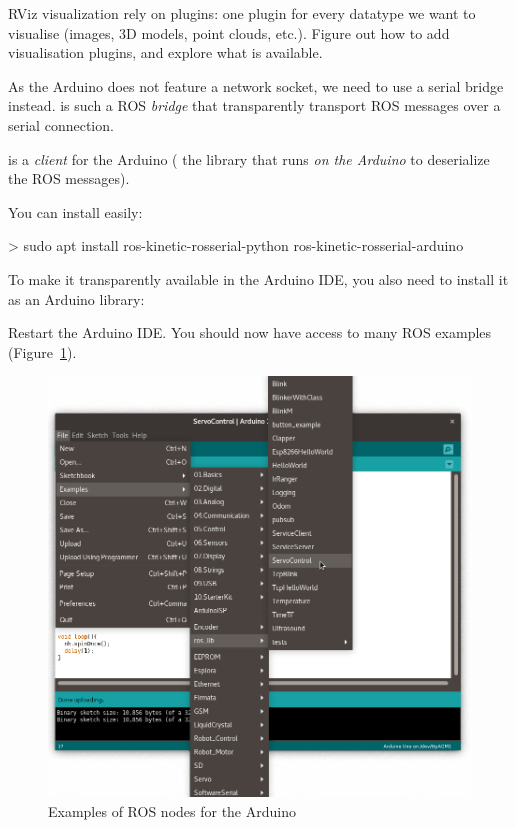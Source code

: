\documentclass{instructions}
\begin{document}
RViz visualization rely on plugins: one plugin for every datatype we want to
visualise (images, 3D models, point clouds, etc.). Figure out how to add
visualisation plugins, and explore what is available.


As the Arduino does not feature a network socket, we need to use a serial bridge
instead.   is such a ROS \emph{bridge} that transparently
transport ROS messages over a serial connection.

 is a  \emph{client} for the Arduino (\ie
the library that runs \emph{on the Arduino} to deserialize the ROS messages).

You can install  easily:

\begin{shcode}
> sudo apt install ros-kinetic-rosserial-python ros-kinetic-rosserial-arduino
\end{shcode}

To make it transparently available in the Arduino IDE, you also need to install
it as an Arduino library:


Restart the Arduino IDE. You should now have access to many ROS examples
(Figure~\ref{ros-arduino-examples}).

\begin{figure}[h!]
    \centering
    \includegraphics[width=0.56\linewidth]{arduino-ide-ros}
    \caption{Examples of ROS nodes for the Arduino}
    \label{ros-arduino-examples}
\end{figure}
\end{document}
